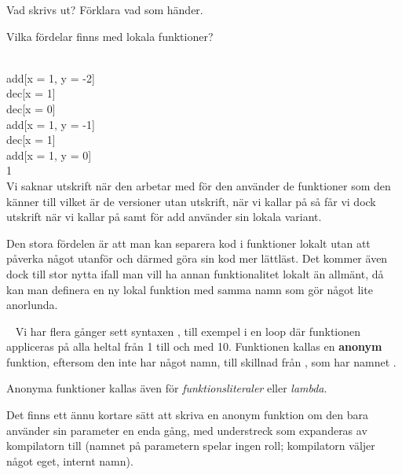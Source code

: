 \Subtask Vad skrivs ut? Förklara vad som händer.

\Subtask Vilka fördelar finns med lokala funktioner?


\SOLUTION


\TaskSolved \what


\\
add[x = 1, y = -2]\\
dec[x = 1]\\
dec[x = 0]\\
add[x = 1, y = -1]\\
dec[x = 1]\\
add[x = 1, y = 0]\\
1\\
Vi saknar utskrift när den arbetar med  för den använder de funktioner som den känner till vilket är de versioner utan utskrift, när vi kallar på  så får vi dock utskrift när vi kallar på  samt  för add använder sin lokala variant.

\SubtaskSolved
Den stora fördelen är att man kan separera kod i funktioner lokalt utan att påverka något utanför och därmed göra sin kod mer lättläst. Det kommer även dock till stor nytta ifall man vill ha annan funktionalitet lokalt än allmänt, då kan man definera en ny lokal funktion med samma namn som gör något lite anorlunda.



\QUESTEND









\QUESTBEGIN

\Task  \what~  Vi har flera gånger sett syntaxen , till exempel i en loop  där funktionen  appliceras på alla heltal från 1 till och med 10. Funktionen  kallas en \textbf{anonym} funktion, eftersom den inte har något namn, till skillnad från , som har namnet .

Anonyma funktioner kallas även för \emph{funktionsliteraler} eller \emph{lambda}.

Det finns ett ännu kortare sätt att skriva en anonym funktion om den bara använder sin parameter en enda gång, med understreck  som expanderas av kompilatorn till  (namnet på parametern spelar ingen roll; kompilatorn väljer något eget, internt namn).

